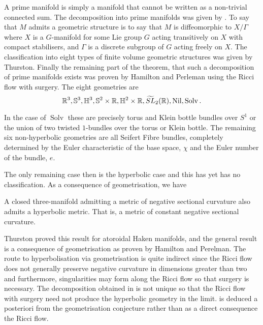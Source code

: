 \documentclass[a4paper,12pt]{amsart}
\begin{document}
A prime manifold is simply a manifold that cannot be written as a non-trivial connected sum. The decomposition into prime manifolds was given by \cite{MR0142125}. To say that \(M\) admits a geometric structure is to say that \(M\) is diffeomorphic to \(X/\Gamma\) where \(X\) is a \(G\)-manifold for some Lie group \(G\) acting transitively on \(X\) with compact stabilisers, and \(\Gamma\) is a discrete subgroup of \(G\) acting freely on \(X\). The classification into eight types of finite volume geometric structures was given by Thurston. Finally the remaining part of the theorem, that such a decomposition of prime manifolds exists was proven by Hamilton and Perleman using the Ricci flow with surgery. The eight geometries are
\[
\mathbb{R}^3, \mathbb{S}^3, \mathbb{H}^3, \mathbb{S}^2 \times \mathbb{R}, \mathbb{H}^2 \times \mathbb{R}, \widetilde{SL}_2(\mathbb{R}), \operatorname{Nil}, \operatorname{Solv}.
\]

In the case of \(\operatorname{Solv}\) these are precisely torus and Klein bottle bundles over \(S^1\) or the union of two twisted \(1\)-bundles over the torus or Klein bottle. The remaining six non-hyperbolic geometries are all Seifert Fibre bundles, completely determined by the Euler characteristic of the base space, \(\chi\) and the Euler number of the bundle, \(e\).

The only remaining case then is the hyperbolic case and this has yet has no classification. As a consequence of geometrisation, we have

\begin{thm}[Hyperbolisation]
\label{thm:hyperbolisation}

A closed three-manifold admitting a metric of negative sectional curvature also admits a hyperbolic metric. That is, a metric of constant negative sectional curvature.
\end{thm}

Thurston proved this result for atoroidal Haken manifolds, and the general result is a consequence of geometrisation as proven by Hamilton and Perelman. The route to hyperbolisation via geometrisation is quite indirect since the Ricci flow does not generally preserve negative curvature in dimensions greater than two and furthermore, singularities may form along the Ricci flow so that surgery is necessary. The decomposition obtained in  is not unique so that the Ricci flow with surgery need not produce the hyperbolic geometry in the limit.  is deduced a posteriori from the geometrisation conjecture rather than as a direct consequence the Ricci flow.
\end{document}
